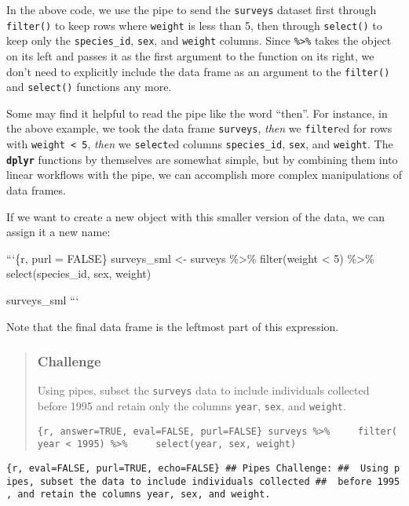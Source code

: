 \documentclass[]{article}
\begin{document}
In the above code, we use the pipe to send the \texttt{surveys} dataset
first through \texttt{filter()} to keep rows where \texttt{weight} is
less than 5, then through \texttt{select()} to keep only the
\texttt{species\_id}, \texttt{sex}, and \texttt{weight} columns. Since
\texttt{\%\textgreater{}\%} takes the object on its left and passes it
as the first argument to the function on its right, we don't need to
explicitly include the data frame as an argument to the
\texttt{filter()} and \texttt{select()} functions any more.

Some may find it helpful to read the pipe like the word ``then''. For
instance, in the above example, we took the data frame \texttt{surveys},
\emph{then} we \texttt{filter}ed for rows with
\texttt{weight\ \textless{}\ 5}, \emph{then} we \texttt{select}ed
columns \texttt{species\_id}, \texttt{sex}, and \texttt{weight}. The
\textbf{\texttt{dplyr}} functions by themselves are somewhat simple, but
by combining them into linear workflows with the pipe, we can accomplish
more complex manipulations of data frames.

If we want to create a new object with this smaller version of the data,
we can assign it a new name:

```\{r, purl = FALSE\} surveys\_sml \textless{}- surveys
\%\textgreater{}\% filter(weight \textless{} 5) \%\textgreater{}\%
select(species\_id, sex, weight)

surveys\_sml ```

Note that the final data frame is the leftmost part of this expression.

\begin{quote}
\subsubsection{Challenge}\label{challenge}

Using pipes, subset the \texttt{surveys} data to include individuals
collected before 1995 and retain only the columns \texttt{year},
\texttt{sex}, and \texttt{weight}.

\texttt{\{r,\ answer=TRUE,\ eval=FALSE,\ purl=FALSE\}\ surveys\ \%\textgreater{}\%\ \ \ \ \ filter(year\ \textless{}\ 1995)\ \%\textgreater{}\%\ \ \ \ \ select(year,\ sex,\ weight)}
\end{quote}

\texttt{\{r,\ eval=FALSE,\ purl=TRUE,\ echo=FALSE\}\ \#\#\ Pipes\ Challenge:\ \#\#\ \ Using\ pipes,\ subset\ the\ data\ to\ include\ individuals\ collected\ \#\#\ \ before\ 1995,\ and\ retain\ the\ columns\ \textasciigrave{}year\textasciigrave{},\ \textasciigrave{}sex\textasciigrave{},\ and\ \textasciigrave{}weight.\textasciigrave{}}
\end{document}

